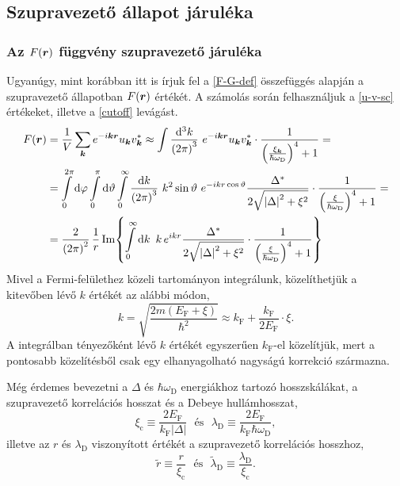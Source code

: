 \documentclass[a4paper,12pt,titlepage]{article}
\newcommand{\KK}{{\vb*{k}}}
\newcommand{\RR}{{\vb*{r}}}
\newcommand{\kF}{{k_\text{F}}}
\newcommand{\EF}{{E_\text{F}}}
\begin{document}
\subsection{Szupravezető állapot járuléka}

\subsubsection{Az $F(\RR)$ függvény szupravezető járuléka}

Ugyanúgy, mint korábban itt is írjuk fel a \eqref{F-G-def} összefüggés alapján a szupravezető állapotban $F(\RR)$ értékét.  A számolás során felhasználjuk a \eqref{u-v-sc} értékeket, illetve a \eqref{cutoff} levágást.
\begin{equation}
\begin{split}
	F(\RR) & = \frac{1}{V} \sum\limits_\KK e^{-i \KK \RR} u_\KK v_\KK^* \approx \int \frac{\dd[3]k}{\left( 2 \pi \right)^3} ~ e^{-i \KK \RR} u_\KK v_\KK^* \cdot \frac{1}{\left( \frac{\xi_\KK}{\hbar \omega_\text{D}} \right)^4 + 1} = \\
	& = \int\limits_0^{2 \pi} \dd{\varphi} \int\limits_0^\pi \dd{\vartheta} \int\limits_0^\infty \frac{\dd{k}}{\left( 2 \pi \right)^3} ~ k^2 \sin\vartheta ~ e^{-i k r \cos\vartheta} \frac{\Delta^*}{2 \sqrt{\left| \Delta \right|^2 + \xi^2}} \cdot \frac{1}{\left( \frac{\xi}{\hbar \omega_\text{D}} \right)^4 + 1} = \\
	& = \frac{2}{\left( 2 \pi \right)^2} \, \frac{1}{r} \Im{ \int\limits_0^\infty \dd{k} ~ k \, e^{i k r} \frac{\Delta^*}{2 \sqrt{\left| \Delta \right|^2 + \xi^2}} \cdot \frac{1}{\left( \frac{\xi}{\hbar \omega_\text{D}} \right)^4 + 1} }
\end{split}
\end{equation}
Mivel a Fermi-felülethez közeli tartományon integrálunk, közelíthetjük a kitevőben lévő $k$ értékét az alábbi módon,
\begin{equation} \label{k-xi-approx}
	k = \sqrt{\frac{2 m \left( \EF + \xi \right)}{\hbar^2}} \approx \kF + \frac{\kF}{2 \EF} \cdot \xi.
\end{equation}
A integrálban tényezőként lévő $k$ értékét egyszerűen $\kF$-el közelítjük, mert a pontosabb közelítésből csak egy elhanyagolható nagyságú korrekció származna.

Még érdemes bevezetni a $\Delta$ és $\hbar \omega_\text{D}$ energiákhoz tartozó hosszskálákat, a szupravezető korrelációs hosszat és a Debeye hullámhosszat,
\begin{equation}
	\xi_\text{c} \equiv \frac{2 \EF}{\kF \left| \Delta \right|} ~~~ \text{és} ~~~ \lambda_\text{D} \equiv \frac{2 \EF}{\kF \hbar \omega_\text{D}},
\end{equation}
illetve az $r$ és $\lambda_\text{D}$ viszonyított értékét a szupravezető korrelációs hosszhoz,
\begin{equation}
	\tilde{r} \equiv \frac{r}{\xi_\text{c}} ~~~ \text{és} ~~~ \tilde{\lambda}_\text{D} \equiv \frac{\lambda_\text{D}}{\xi_\text{c}}.
\end{equation}
\end{document}
